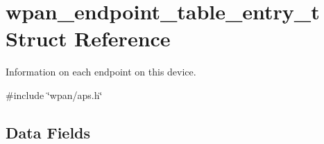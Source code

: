 \hypertarget{structwpan__endpoint__table__entry__t}{}\section{wpan\+\_\+endpoint\+\_\+table\+\_\+entry\+\_\+t Struct Reference}
\label{structwpan__endpoint__table__entry__t}


Information on each endpoint on this device.  




{\ttfamily \#include \char`\"{}wpan/aps.\+h\char`\"{}}

\subsection*{Data Fields}
